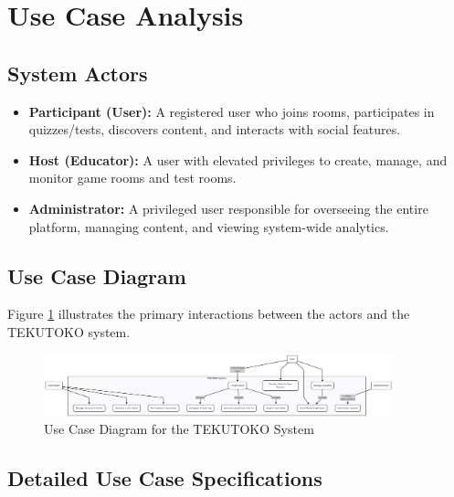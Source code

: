 \FloatBarrier
\section{Use Case Analysis}
\label{sec:use-case}

\subsection{System Actors}
\begin{itemize}
    \item \textbf{Participant (User):} A registered user who joins rooms, participates in quizzes/tests, discovers content, and interacts with social features.
    \item \textbf{Host (Educator):} A user with elevated privileges to create, manage, and monitor game rooms and test rooms.
    \item \textbf{Administrator:} A privileged user responsible for overseeing the entire platform, managing content, and viewing system-wide analytics.
\end{itemize}

\subsection{Use Case Diagram}
Figure \ref{fig:use-case-diagram} illustrates the primary interactions between the actors and the TEKUTOKO system.

\begin{figure}[htbp]
\centering
\includegraphics[width=0.9\textwidth]{figures/use-case-diagram.png}
\caption{Use Case Diagram for the TEKUTOKO System}
\label{fig:use-case-diagram}
\end{figure}

\subsection{Detailed Use Case Specifications}

